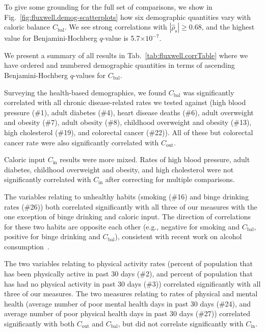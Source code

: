 \documentclass[10pt]{article}
\newcommand{\calin}{C_{\textrm{in}}}
\newcommand{\calout}{C_{\textrm{out}}}
\newcommand{\calbal}{C_{\textrm{bal}}}
\newcommand{\rhospearman}{\hat{\rho}_{\textrm{s}}}
\begin{document}
To give some grounding for the full set of comparisons,
we show in Fig.~\ref{fig:fluxwell.demog-scatterplots}
how six demographic quantities vary with caloric balance $\calbal$.
We see strong correlations with $|\rhospearman| \ge 0.68$,
and the highest value for Benjamini-Hochberg $q$-value is 5.7$\times$$10^{-7}$.

We present a summary of all results in Tab.~\ref{tab:fluxwell.corrTable}
where we have ordered and numbered demographic quantities in terms of
ascending  
Benjamini-Hochberg $q$-values for $\calbal$.

Surveying the health-based demographics,
we found $\calbal$  
was significantly correlated with 
all chronic
disease-related rates we tested against (high blood pressure (\#1),
adult diabetes (\#4), heart disease deaths (\#6), adult overweight and
obesity (\#7), adult obesity (\#8), childhood overweight and obesity
(\#13), high cholesterol (\#19), and colorectal cancer (\#22)).
All of these but colorectal
cancer rate were also significantly correlated with $\calout$.

Caloric input $\calin$ results were more mixed.  
Rates of high blood pressure,
adult diabetes, childhood overweight and obesity, and high cholesterol
were not significantly correlated with $\calin$ after
correcting for multiple comparisons.  

The variables relating to
unhealthy habits (smoking (\#16) and binge drinking rates (\#26)) both
correlated significantly with all three of our measures with
the one exception of binge drinking and caloric input.
The direction of correlations for these two habits 
are opposite each other (e.g., negative for smoking and $\calbal$, 
positive for binge drinking and $\calbal$), consistent with 
recent work on alcohol consumption~\cite{french2009a}.

The two variables relating to physical activity rates (percent of
population that has been physically active in past 30 days (\#2), and
percent of population that has had no physical activity in past 30
days (\#3)) correlated significantly with all three of our measures.
The two measures relating to rates of physical and mental health
(average number of poor mental health days in past 30 days (\#24), and
average number of poor physical health days in past 30 days (\#27))
correlated significantly with both $\calout$ and $\calbal$,
but did not correlate significantly with $\calin$.
\end{document}
